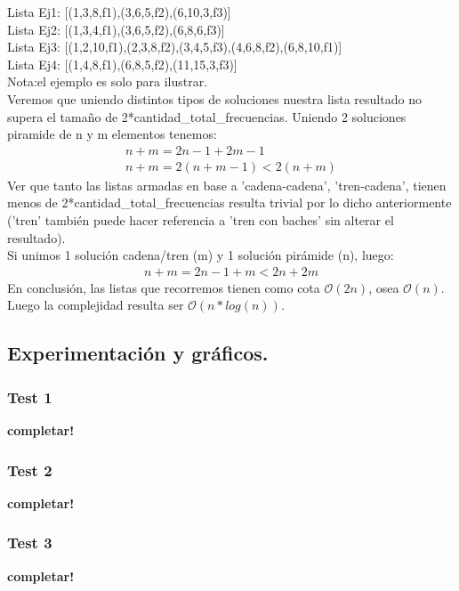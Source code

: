 Lista Ej1: [(1,3,8,f1),(3,6,5,f2),(6,10,3,f3)]\\
Lista Ej2: [(1,3,4,f1),(3,6,5,f2),(6,8,6,f3)]\\
Lista Ej3: [(1,2,10,f1),(2,3,8,f2),(3,4,5,f3),(4,6,8,f2),(6,8,10,f1)]\\
Lista Ej4: [(1,4,8,f1),(6,8,5,f2),(11,15,3,f3)]\\
Nota:el ejemplo es solo para ilustrar.\\
Veremos que uniendo distintos tipos de soluciones nuestra lista resultado no supera el tamaño de 2*cantidad_total_frecuencias.
Uniendo 2 soluciones piramide de n y m elementos tenemos:\\
\begin{equation*}
\begin{array}{l}
n+m = 2n-1+2m-1\\
n+m = 2(n+m-1)<2(n+m)
\end{array}
\end{equation*}
Ver que tanto las listas armadas en base a 'cadena-cadena', 'tren-cadena', tienen menos de 2*cantidad_total_frecuencias resulta trivial por lo dicho anteriormente ('tren' también puede hacer referencia a 'tren con baches' sin alterar el resultado).\\
Si unimos 1 solución cadena/tren (m) y 1 solución pirámide (n), luego:
\begin{equation*}
\begin{array}{l}
n+m=2n-1+m<2n+2m
\end{array}
\end{equation*}
En conclusión, las listas que recorremos tienen como cota $\mathcal{O}(2n)$, osea $\mathcal{O}(n)$. 
Luego la complejidad resulta ser $\mathcal{O}(n*log(n))$.
\vspace*{0.6cm}

\subsection{Experimentación y gráficos.}

\vspace*{0.3cm}

\subsubsection{Test 1}

\vspace*{0.3cm}

\textbf{completar!}


\newpage
\subsubsection{Test 2}

\vspace*{0.3cm}

\textbf{completar!}


\newpage
\subsubsection{Test 3}

\vspace*{0.3cm}

\textbf{completar!}
